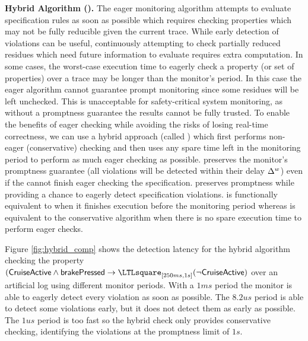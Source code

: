 \noindent\textbf{Hybrid Algorithm (\ha).}
The eager monitoring algorithm attempts to evaluate specification rules as soon as possible
which requires checking properties which may not be fully reducible given the current trace.
While early detection of violations can be useful, continuously attempting to check
partially reduced residues which need future information to evaluate requires extra computation.
In some cases, the worst-case execution time to eagerly check a property (or set of properties)
over a trace may be longer than the monitor's period.
In this case the eager algorithm cannot guarantee prompt monitoring since some
residues will be left unchecked. This is unacceptable for
safety-critical system monitoring, as without a promptness guarantee the results cannot be fully trusted. 
%
To enable the benefits of eager checking while avoiding the risks of losing
real-time correctness, we can use a hybrid approach (called \ha) which first performs non-eager
(conservative) checking and then uses any spare time left in the monitoring period to
perform as much eager checking as possible.
\ha preserves the monitor's promptness guarantee (all violations will be
detected within their delay $\Delta^w$) even if the \monitor cannot finish eager
checking the specification.
\ha preserves promptness while providing a chance to eagerly detect specification violations.
\ha is functionally equivalent to \monitor when it finishes
execution before the monitoring period whereas \ha is
equivalent to the conservative algorithm when there is no spare execution time to perform eager checks.

Figure \ref{fig:hybrid_comp} shows the detection latency for the hybrid algorithm checking  the property $(\pred{CruiseActive} \wedge \pred{brakePressed} \rightarrow \henceforth_{[250ms, 1s]} (\neg \pred{CruiseActive})$ over an artificial log using different monitor periods. 
With a $1ms$ period the monitor is able to eagerly detect every violation as soon as possible. 
The $8.2us$ period is able to detect some violations early, but it does not detect them as early as possible. 
The $1us$ period is too fast so the hybrid check only provides conservative checking, identifying the violations at the promptness limit of $1s$.

